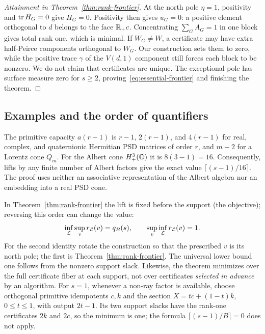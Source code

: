 \begin{proof}[Attainment in Theorem~\ref{thm:rank-frontier}]
At the north pole $\eta=1$, positivity and $\operatorname{tr} H_G=0$ give $H_G=0$.
Positivity then gives $u_G=0$: a positive element orthogonal to $d$
belongs to the face $\mathbb R_+c$. Concentrating $\sum_G A_G=1$ in one block
gives total rank one, which is minimal. If $W_G\ne W$, a
certificate may have extra half-Peirce components orthogonal to $W_G$.
Our construction sets them to zero, while the positive trace $\gamma$ of
the $V(d,1)$ component still forces each block to be nonzero. We do not
claim that certificates are unique. The exceptional pole has surface measure zero for
$s\geq2$, proving~\eqref{eq:essential-frontier} and finishing the theorem.
\end{proof}

\subsection{Examples and the order of quantifiers}
The primitive capacity $a(r-1)$ is $r-1$, $2(r-1)$, and $4(r-1)$ for
real, complex, and quaternionic Hermitian PSD matrices of order $r$, and
$m-2$ for a Lorentz cone $Q_m$. For the Albert cone $H_+^3(\mathbb O)$ it is
$8(3-1)=16$. Consequently, lifts by any finite number of Albert factors
give the exact value $\lceil(s-1)/16\rceil$. The proof uses neither an associative
representation of the Albert algebra nor an embedding into a real PSD
cone.

In Theorem~\ref{thm:rank-frontier} the lift is fixed before the support
(the objective); reversing this order can change the value:
\begin{equation}\label{eq:quantifier-reversal}
 \inf_{\mathcal L}\sup_v r_{\mathcal L}(v)=q_B(s),\qquad
 \sup_v\inf_{\mathcal L}r_{\mathcal L}(v)=1.
\end{equation}
For the second identity rotate the construction so that the prescribed
$v$ is its north pole; the first is Theorem~\ref{thm:rank-frontier}.
The universal lower bound one follows from the nonzero support slack.
Likewise, the theorem minimizes over the full certificate fiber at each
support, not over certificates \emph{selected in advance} by an
algorithm. For $s=1$, whenever a non-ray factor is available, choose
orthogonal primitive idempotents $c,k$ and the section $X=tc+(1-t)k$,
$0\leq t\leq1$, with output $2t-1$. Its two support slacks have the
rank-one certificates $2k$ and $2c$, so the minimum is one; the formula
$\lceil(s-1)/B\rceil=0$ does not apply.
